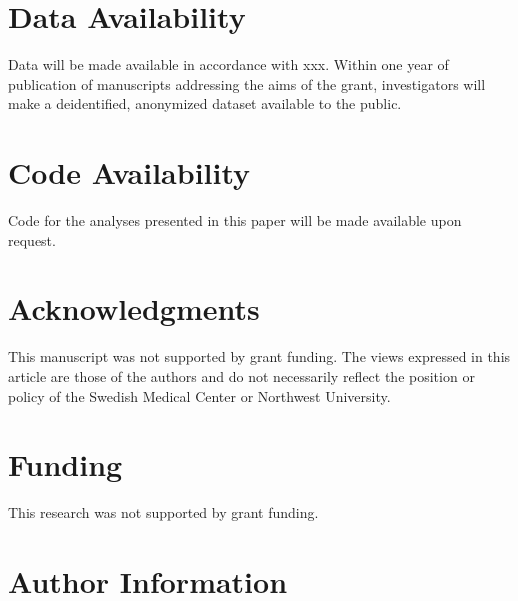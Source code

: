 \documentclass[
  letterpaper,
]{article}
\begin{document}

\hypertarget{data-availability}{%
\chapter*{Data Availability}\label{data-availability}}

Data will be made available in accordance with xxx. Within one year of
publication of manuscripts addressing the aims of the grant,
investigators will make a deidentified, anonymized dataset available to
the public.


\hypertarget{code-availability}{%
\chapter*{Code Availability}\label{code-availability}}

Code for the analyses presented in this paper will be made available
upon request.


\hypertarget{acknowledgments}{%
\chapter*{Acknowledgments}\label{acknowledgments}}

This manuscript was not supported by grant funding. The views expressed
in this article are those of the authors and do not necessarily reflect
the position or policy of the Swedish Medical Center or Northwest
University.


\hypertarget{funding}{%
\chapter*{Funding}\label{funding}}

This research was not supported by grant funding.


\hypertarget{author-information}{%
\chapter*{Author Information}\label{author-information}}
\end{document}
